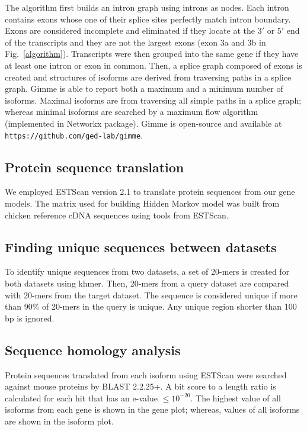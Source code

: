 \documentclass[10pt]{article}
\begin{document}
The algorithm first builds an intron graph using introns as nodes.
Each intron contains exons whose one of their splice sites perfectly match intron boundary.
Exons are considered incomplete and eliminated if they locate at the $3'$ or $5'$ end of the transcripts and
they are not the largest exons (exon 3a and 3b in Fig.~\ref{algorithm}).
Transcripts were then grouped into the same gene if they have at least one intron or exon in common.
Then, a splice graph composed of exons is created and structures of isoforms are derived from traversing paths in a splice graph.
Gimme is able to report both a maximum and a minimum number of isoforms.
Maximal isoforms are from traversing all simple paths in a splice graph; whereas minimal isoforms are searched by
a maximum flow algorithm (implemented in Networkx package).
Gimme is open-source and available at \texttt{https://github.com/ged-lab/gimme}.

\subsection*{Protein sequence translation}

We employed ESTScan version 2.1 to translate protein sequences from our gene models.
The matrix used for building Hidden Markov model was built from chicken reference cDNA sequences using tools from ESTScan.

\subsection*{Finding unique sequences between datasets}

To identify unique sequences from two datasets, a set of 20-mers is created for both datasets using
khmer\cite{khmer}.
Then, 20-mers from a query dataset are compared with 20-mers from the target dataset.
The sequence is considered unique if more than 90\% of 20-mers in the query is unique.
Any unique region shorter than 100 bp is ignored.

\subsection*{Sequence homology analysis}

Protein sequences translated from each isoform using ESTScan were searched against mouse proteins by BLAST 2.2.25+\cite{Tatusova:1999tz}.
A bit score to a length ratio is calculated for each hit that has an e-value $\le 10^{-20}$.
The highest value of all isoforms from each gene is shown in the gene plot; whereas, values of all isoforms are shown in the isoform plot.
\end{document}
